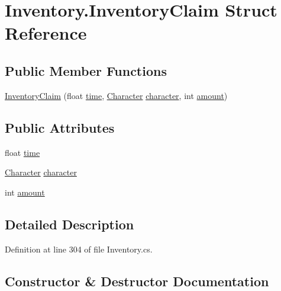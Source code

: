 \hypertarget{struct_inventory_1_1_inventory_claim}{}\section{Inventory.\+Inventory\+Claim Struct Reference}
\label{struct_inventory_1_1_inventory_claim}
\subsection*{Public Member Functions}
\begin{DoxyCompactItemize}
\item 
\hyperlink{struct_inventory_1_1_inventory_claim_a279d2c85495f2f5791e1f5fa86665cfb}{Inventory\+Claim} (float \hyperlink{struct_inventory_1_1_inventory_claim_adc1cc66a0221f501d54fc6d2b922d2f5}{time}, \hyperlink{class_project_porcupine_1_1_entities_1_1_character}{Character} \hyperlink{struct_inventory_1_1_inventory_claim_a3851017ecf448aef29e7f9ecd0fbb3f1}{character}, int \hyperlink{struct_inventory_1_1_inventory_claim_a4b414f97f551d59b3c761da88225c845}{amount})
\end{DoxyCompactItemize}
\subsection*{Public Attributes}
\begin{DoxyCompactItemize}
\item 
float \hyperlink{struct_inventory_1_1_inventory_claim_adc1cc66a0221f501d54fc6d2b922d2f5}{time}
\item 
\hyperlink{class_project_porcupine_1_1_entities_1_1_character}{Character} \hyperlink{struct_inventory_1_1_inventory_claim_a3851017ecf448aef29e7f9ecd0fbb3f1}{character}
\item 
int \hyperlink{struct_inventory_1_1_inventory_claim_a4b414f97f551d59b3c761da88225c845}{amount}
\end{DoxyCompactItemize}


\subsection{Detailed Description}


Definition at line 304 of file Inventory.\+cs.



\subsection{Constructor \& Destructor Documentation}
\mbox{\label{struct_inventory_1_1_inventory_claim_a279d2c85495f2f5791e1f5fa86665cfb}} 

